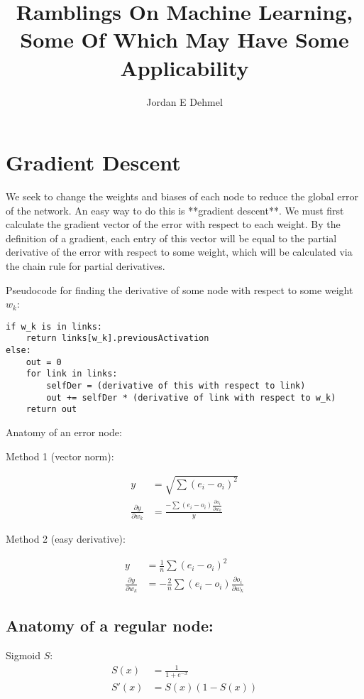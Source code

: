 \documentclass[8pt]{amsart}
\title{Ramblings On Machine Learning, Some Of Which May Have Some Applicability}
\author{Jordan E Dehmel}
\begin{document}
\maketitle

\section{Gradient Descent}

We seek to change the weights and biases of each node to reduce the
global error of the network. An easy way to do this is **gradient descent**.
We must first calculate the gradient vector of the error with respect to
each weight. By the definition of a gradient, each entry of this vector will
be equal to the partial derivative of the error with respect to some weight,
which will be calculated via the chain rule for partial derivatives.

Pseudocode for finding the derivative of some node with respect to
some weight $w_k$:

\begin{verbatim}
if w_k is in links:
    return links[w_k].previousActivation
else:
    out = 0
    for link in links:
        selfDer = (derivative of this with respect to link)
        out += selfDer * (derivative of link with respect to w_k)
    return out
\end{verbatim}

Anatomy of an error node:

Method 1 (vector norm):

$$
\begin{aligned}
    y &= \sqrt{\sum{(e_i - o_i)^2}} \\
    \frac{\partial y}{\partial w_k} &= \frac{-\sum{(e_i - o_i)\frac{\partial o_i}{\partial w_k}}}{y}
\end{aligned}
$$

Method 2 (easy derivative):

$$
\begin{aligned}
    y &= \frac{1}{n} \sum{(e_i - o_i)^2} \\
    \frac{\partial y}{\partial w_k} &= - \frac{2}{n} \sum{(e_i - o_i) \frac{\partial o_i}{\partial w_k}}
\end{aligned}
$$

\subsection{Anatomy of a regular node:}

Sigmoid $S$:
$$
\begin{aligned}
    S(x) &= \frac{1}{1 + e^{-x}} \\
    S'(x) &= S(x) (1 - S(x))
\end{aligned}
$$
\end{document}
